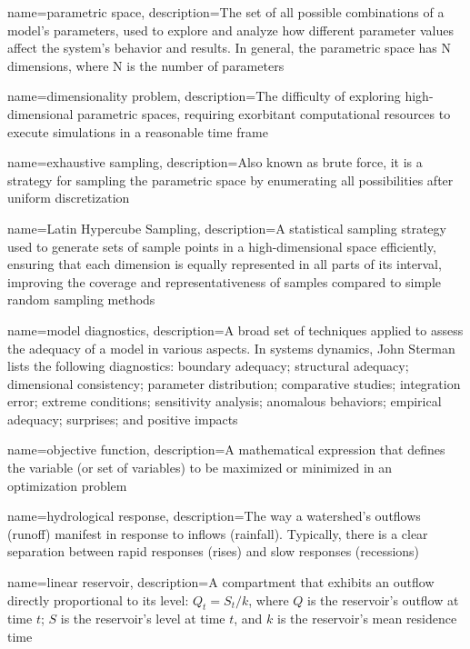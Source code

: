 {
    name=parametric space,
    description={The set of all possible combinations of a model's parameters, used to explore and analyze how different parameter values affect the system's behavior and results. In general, the parametric space has N dimensions, where N is the number of parameters}
}

{
    name=dimensionality problem,
    description={The difficulty of exploring high-dimensional parametric spaces, requiring exorbitant computational resources to execute simulations in a reasonable time frame}
}

{
    name=exhaustive sampling,
    description={Also known as brute force, it is a strategy for sampling the parametric space by enumerating all possibilities after uniform discretization}
}

{
    name=Latin Hypercube Sampling,
    description={A statistical sampling strategy used to generate sets of sample points in a high-dimensional space efficiently, ensuring that each dimension is equally represented in all parts of its interval, improving the coverage and representativeness of samples compared to simple random sampling methods}
}

{
    name=model diagnostics,
    description={A broad set of techniques applied to assess the adequacy of a model in various aspects. In systems dynamics, John Sterman lists the following diagnostics: boundary adequacy; structural adequacy; dimensional consistency; parameter distribution; comparative studies; integration error; extreme conditions; sensitivity analysis; anomalous behaviors; empirical adequacy; surprises; and positive impacts}
}

{
    name=objective function,
    description={A mathematical expression that defines the variable (or set of variables) to be maximized or minimized in an optimization problem}
}

{
    name=hydrological response,
    description={The way a watershed's outflows (runoff) manifest in response to inflows (rainfall). Typically, there is a clear separation between rapid responses (rises) and slow responses (recessions)}
}

{
    name=linear reservoir,
    description={A compartment that exhibits an outflow directly proportional to its level: $Q_t = S_t/k$, where $Q$ is the reservoir's outflow at time $t$; $S$ is the reservoir's level at time $t$, and $k$ is the reservoir's mean residence time}
}

